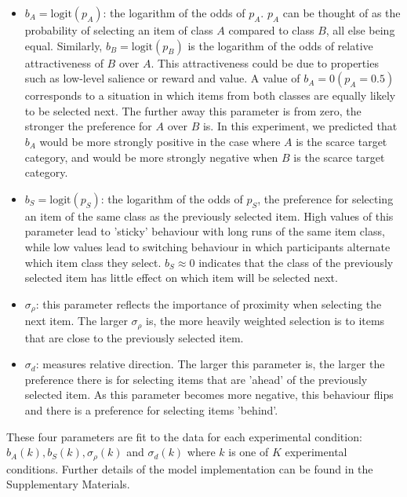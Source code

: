 \documentclass[12pt]{article}
\begin{document}
\begin{itemize}
  \item $b_A = \text{logit}(p_A)$: the logarithm of the odds of $p_A$. $p_A$ can be thought of as the probability of selecting an item of class $A$ compared to class $B$, all else being equal. Similarly, $b_B = \text{logit}(p_B)$ is the logarithm of the odds of relative attractiveness of $B$ over $A$. This attractiveness could be due to properties such as low-level salience or reward and value. A value of $b_A = 0 (p_A = 0.5)$ corresponds to a situation in which items from both classes are equally likely to be selected next. The further away this parameter is from zero, the stronger the preference for $A$ over $B$ is. In this experiment, we predicted that $b_A$ would be more strongly positive in the case where $A$ is the scarce target category, and would be more strongly negative when $B$ is the scarce target category.
  
  \item $b_S = \text{logit}(p_S)$: the logarithm of the odds of $p_S$, the preference for selecting an item of the same class as the previously selected item. High values of this parameter lead to 'sticky' behaviour with long runs of the same item class, while low values lead to switching behaviour in which participants alternate which item class they select. $b_S\approx0$ indicates that the class of the previously selected item has little effect on which item will be selected next.\
  
  \item $\sigma_{\rho}$: this parameter reflects the importance of proximity when selecting the next item. The larger $\sigma_{\rho}$ is, the more heavily weighted selection is to items that are close to the previously selected item. 

  \item $\sigma_d$: measures relative direction. The larger this parameter is, the larger the preference there is for selecting items that are 'ahead' of the previously selected item. As this parameter becomes more negative, this behaviour flips and there is a preference for selecting items 'behind'.
\end{itemize}

These four parameters are fit to the data for each experimental condition: $b_A(k), b_S(k), \sigma_{\rho}(k)$ and $\sigma_d(k)$ where $k$ is one of $K$ experimental conditions. Further details of the model implementation can be found in the Supplementary Materials.
\end{document}
